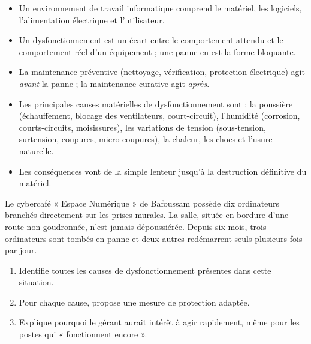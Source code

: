 \documentclass[11pt]{article}
\newcommand{\cle}[1]{{\popxbold\color{popdark}#1}}
\begin{document}
\begin{aretenir}
\begin{itemize}
  \item Un environnement de travail informatique comprend le matériel, les logiciels, l'alimentation électrique et l'utilisateur.
  \item Un dysfonctionnement est un écart entre le comportement attendu et le comportement réel d'un équipement ; une panne en est la forme bloquante.
  \item La \cle{maintenance préventive} (nettoyage, vérification, protection électrique) agit \emph{avant} la panne ; la maintenance curative agit \emph{après}.
  \item Les principales causes matérielles de dysfonctionnement sont : la \cle{poussière} (échauffement, blocage des ventilateurs, court-circuit), l'\cle{humidité} (corrosion, courts-circuits, moisissures), les \cle{variations de tension} (sous-tension, surtension, coupures, micro-coupures), la chaleur, les chocs et l'usure naturelle.
  \item Les conséquences vont de la simple lenteur jusqu'à la destruction définitive du matériel.
\end{itemize}
\end{aretenir}

\begin{exercice}
Le cybercafé « Espace Numérique » de Bafoussam possède dix ordinateurs branchés directement sur les prises murales. La salle, située en bordure d'une route non goudronnée, n'est jamais dépoussiérée. Depuis six mois, trois ordinateurs sont tombés en panne et deux autres redémarrent seuls plusieurs fois par jour.
\begin{enumerate}
  \item Identifie toutes les causes de dysfonctionnement présentes dans cette situation.
  \item Pour chaque cause, propose une mesure de protection adaptée.
  \item Explique pourquoi le gérant aurait intérêt à agir rapidement, même pour les postes qui « fonctionnent encore ».
\end{enumerate}
\end{exercice}
\end{document}
